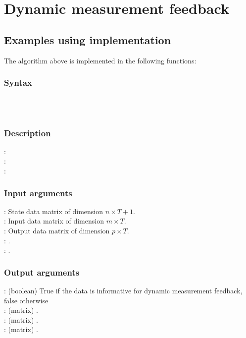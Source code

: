 \section{Dynamic measurement feedback}












\subsection{Examples using implementation}
The algorithm above is implemented in the following functions:
\subsubsection*{Syntax} 
 \\
 \\

\subsubsection*{Description} 
: \\
: \\
: 

\subsubsection*{Input arguments} 
\textbf{}: State data matrix of dimension $n \times T+1$.\\
\textbf{}: Input data matrix of dimension $m \times T$.\\
\textbf{}: Output data matrix of dimension $p \times T$.\\
\textbf{}: .\\
\textbf{}: .

\subsubsection*{Output arguments} 
\textbf{}: (boolean) True if the data is informative for dynamic measurement feedback, false otherwise\\
\textbf{}: (matrix) .\\
\textbf{}: (matrix) .\\
\textbf{}: (matrix) .


